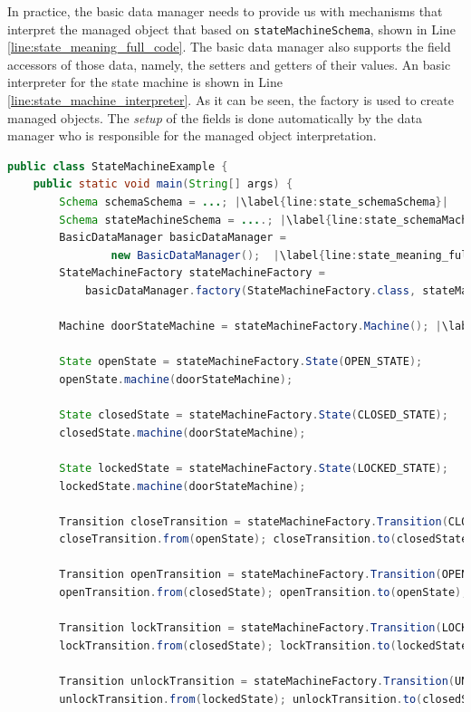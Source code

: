 In practice, the basic data manager needs to provide us with mechanisms that interpret the managed object that based on \texttt{stateMachineSchema}, shown in Line \ref{line:state_meaning_full_code}.
The basic data manager  also supports the field accessors of those data, namely, the setters and getters of their values.
An basic interpreter for the state machine is shown in Line \ref{line:state_machine_interpreter}.
As it can be seen, the factory is used to create managed objects.
The \textit{setup} of the fields is done automatically by the data manager who is responsible for the managed object interpretation.

\begin{sourcecode}
	\begin{lstlisting}[language=Java, escapechar=|]
public class StateMachineExample {
	public static void main(String[] args) {
		Schema schemaSchema = ...; |\label{line:state_schemaSchema}|
		Schema stateMachineSchema = ....; |\label{line:state_schemaMachineSchema}|
		BasicDataManager basicDataManager = 
				new BasicDataManager();  |\label{line:state_meaning_full_code}|
		StateMachineFactory stateMachineFactory = 
			basicDataManager.factory(StateMachineFactory.class, stateMachineSchema);

		Machine doorStateMachine = stateMachineFactory.Machine(); |\label{line:state_machine_creation_basic}|

		State openState = stateMachineFactory.State(OPEN_STATE);
		openState.machine(doorStateMachine);

		State closedState = stateMachineFactory.State(CLOSED_STATE);
		closedState.machine(doorStateMachine);

		State lockedState = stateMachineFactory.State(LOCKED_STATE);
		lockedState.machine(doorStateMachine);

		Transition closeTransition = stateMachineFactory.Transition(CLOSE_TRANSITION);
		closeTransition.from(openState); closeTransition.to(closedState);

		Transition openTransition = stateMachineFactory.Transition(OPEN_TRANSITION);
		openTransition.from(closedState); openTransition.to(openState);

		Transition lockTransition = stateMachineFactory.Transition(LOCK_TRANSITION);
		lockTransition.from(closedState); lockTransition.to(lockedState);

		Transition unlockTransition = stateMachineFactory.Transition(UNLOCK_TRANSITION);
		unlockTransition.from(lockedState); unlockTransition.to(closedState);


\end{lstlisting}
\end{sourcecode}
